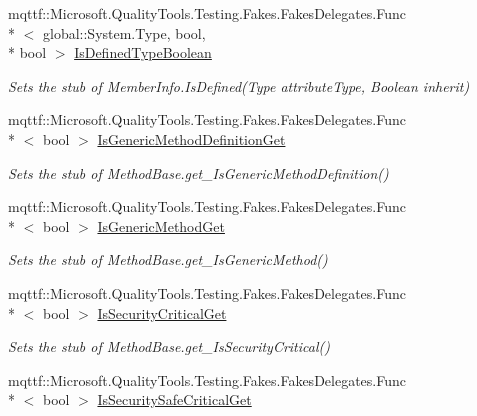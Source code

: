 \begin{DoxyCompactItemize}
mqttf\-::\-Microsoft.\-Quality\-Tools.\-Testing.\-Fakes.\-Fakes\-Delegates.\-Func\\*
$<$ global\-::\-System.\-Type, bool, \\*
bool $>$ \hyperlink{class_system_1_1_reflection_1_1_fakes_1_1_stub_constructor_info_a6ff3bd26fa11a41a1e3eaa92ff5d7f0c}{Is\-Defined\-Type\-Boolean}
\begin{DoxyCompactList}\small\item\em Sets the stub of Member\-Info.\-Is\-Defined(\-Type attribute\-Type, Boolean inherit)\end{DoxyCompactList}\item 
mqttf\-::\-Microsoft.\-Quality\-Tools.\-Testing.\-Fakes.\-Fakes\-Delegates.\-Func\\*
$<$ bool $>$ \hyperlink{class_system_1_1_reflection_1_1_fakes_1_1_stub_constructor_info_a58c3c26e405dcdbdcdb4cb307e8255db}{Is\-Generic\-Method\-Definition\-Get}
\begin{DoxyCompactList}\small\item\em Sets the stub of Method\-Base.\-get\-\_\-\-Is\-Generic\-Method\-Definition()\end{DoxyCompactList}\item 
mqttf\-::\-Microsoft.\-Quality\-Tools.\-Testing.\-Fakes.\-Fakes\-Delegates.\-Func\\*
$<$ bool $>$ \hyperlink{class_system_1_1_reflection_1_1_fakes_1_1_stub_constructor_info_af009a6e8835d611fcc19abb3960b4dac}{Is\-Generic\-Method\-Get}
\begin{DoxyCompactList}\small\item\em Sets the stub of Method\-Base.\-get\-\_\-\-Is\-Generic\-Method()\end{DoxyCompactList}\item 
mqttf\-::\-Microsoft.\-Quality\-Tools.\-Testing.\-Fakes.\-Fakes\-Delegates.\-Func\\*
$<$ bool $>$ \hyperlink{class_system_1_1_reflection_1_1_fakes_1_1_stub_constructor_info_a023e4633d86b9b3da9750848683f17f8}{Is\-Security\-Critical\-Get}
\begin{DoxyCompactList}\small\item\em Sets the stub of Method\-Base.\-get\-\_\-\-Is\-Security\-Critical()\end{DoxyCompactList}\item 
mqttf\-::\-Microsoft.\-Quality\-Tools.\-Testing.\-Fakes.\-Fakes\-Delegates.\-Func\\*
$<$ bool $>$ \hyperlink{class_system_1_1_reflection_1_1_fakes_1_1_stub_constructor_info_a4913b539a6f38f233a3fd742d8b6dbf8}{Is\-Security\-Safe\-Critical\-Get}

\end{DoxyCompactItemize}
